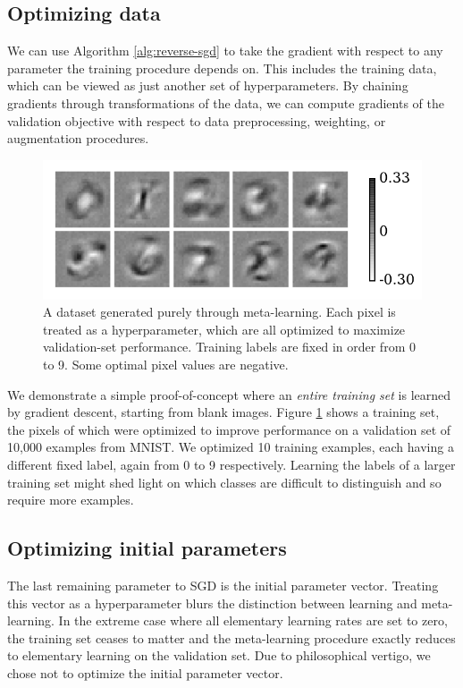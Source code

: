 \documentclass{article}
\newcommand{\primal}{elementary}
\begin{document}
\subsection{Optimizing data}

We can use Algorithm \ref{alg:reverse-sgd} to take the gradient with respect to any parameter the training procedure depends on.
This includes the training data, which can be viewed as just another set of hyperparameters.
By chaining gradients through transformations of the data, we can compute gradients of the validation objective with respect to data preprocessing, weighting, or augmentation procedures.

%
\begin{figure}[b]
\begin{center}
\includegraphics[width=\columnwidth]{../experiments/Jan_19_optimize_data/9_color_bar/fake_data.pdf}
\vskip -0.1in
\caption{A dataset generated purely through meta-learning.
Each pixel is treated as a hyperparameter, which are all optimized to maximize validation-set performance.
Training labels are fixed in order from 0 to 9.
Some optimal pixel values are negative.}
\label{fig:fake data}
\end{center}
\vskip -0.1in
\end{figure}
%
We demonstrate a simple proof-of-concept where an \emph{entire training set} is learned by gradient descent, starting from blank images.
Figure \ref{fig:fake data} shows a training set, the pixels of which were optimized to improve performance on a validation set of 10,000 examples from MNIST.
We optimized 10 training examples, each having a different fixed label, again from 0 to 9 respectively.
Learning the labels of a larger training set might shed light on which classes are difficult to distinguish and so require more examples.

\subsection{Optimizing initial parameters}
The last remaining parameter to SGD is the initial parameter vector.
Treating this vector as a hyperparameter blurs the distinction between learning and meta-learning.
In the extreme case where all \primal{} learning rates are set to zero, the training set ceases to matter and the meta-learning procedure exactly reduces to \primal{} learning on the validation set.
Due to philosophical vertigo, we chose not to optimize the initial parameter vector.
\end{document}
